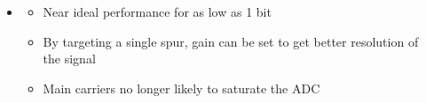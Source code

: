 \documentclass[25pt]{tikzposter} %
\newcommand{\hsct}[1]{{\Large\MakeUppercase{#1}}}
\begin{document}
\begin{columns}
{\begin{tikzfigure}[]
		\end{tikzfigure}
		\begin{itemize}
			\item[] {} %
			\begin{itemize}
				\item {Near ideal performance for as low as 1 bit}
				\item {By targeting a single spur, gain can be set to get better resolution of the signal}
				\item {Main carriers no longer likely to saturate the ADC}								
			\end{itemize}
		\end{itemize}		
	}






\end{columns}
\end{document}
